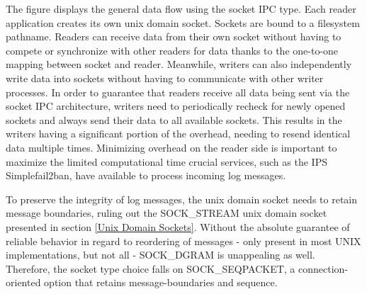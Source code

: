 The figure displays the general data flow using the socket \ac{IPC} type.
Each reader application creates its own unix domain socket.
Sockets are bound to a filesystem pathname.
Readers can receive data from their own socket without having to compete or synchronize with other readers for data thanks to the one-to-one mapping between socket and reader.
Meanwhile, writers can also independently write data into sockets without having to communicate with other writer processes.
In order to guarantee that readers receive all data being sent via the socket \ac{IPC} architecture, writers need to periodically recheck for newly opened sockets and always send their data to all available sockets.
This results in the writers having a significant portion of the overhead, needing to resend identical data multiple times.
Minimizing overhead on the reader side is important to maximize the limited computational time crucial services, such as the \ac{IPS} Simplefail2ban, have available to process incoming log messages.

To preserve the integrity of log messages, the unix domain socket needs to retain message boundaries, ruling out the SOCK\_STREAM unix domain socket presented in section \ref{Unix Domain Sockets}.
Without the absolute guarantee of reliable behavior in regard to reordering of messages - only present in most UNIX implementations, but not all\cite{man:unixsockets} - SOCK\_DGRAM is unappealing as well.
Therefore, the socket type choice falls on SOCK\_SEQPACKET, a connection-oriented option that retains message-boundaries and sequence.